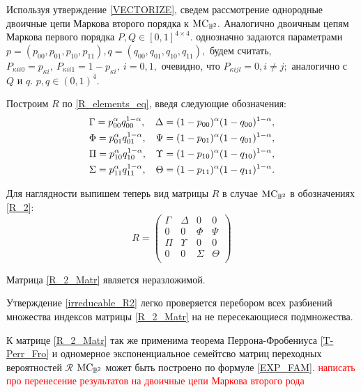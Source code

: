 Используя утверждение \ref{VECTORIZE}, сведем рассмотрение однородные двоичные цепи Маркова второго порядка к $\mathrm{MC}_{\mathbb{B}^2}.$ Аналогично двоичным цепям Маркова первого порядка $P, Q \in [0, 1]^{4 \times 4}.$ однозначно задаются параметрами $p = (p_{00}, p_{01}, p_{10}, p_{11}), q = (q_{00}, q_{01}, q_{10}, q_{11}),$ будем считать, $P_{{\kappa}i i0} = p_{{\kappa}i}, \ P_{{\kappa}i i1} = 1 - p_{{\kappa}i}, \ i = 0, 1,$ очевидно, что $P_{{\kappa}i jl} = 0, i \neq j;$ аналогично с $Q$ и $q.$ $p, q \in (0, 1)^{4}.$

Построим $R$ по \eqref{R_elements_eq}, введя следующие обозначения:
\begin{align}
\label{R_2}
& \Gamma = p_{00}^\alpha q_{00}^{1 - \alpha}, & \Delta = (1 - p_{00})^\alpha(1 - q_{00})^{1 - \alpha}, \nonumber \\
& \Phi = p_{01}^\alpha q_{01}^{1 - \alpha}, & \Psi = (1 - p_{01})^\alpha(1 - q_{01})^{1 - \alpha}, \nonumber \\
& \Pi = p_{10}^\alpha q_{10}^{1 - \alpha}, & \Upsilon = (1 - p_{10})^\alpha(1 - q_{10})^{1 - \alpha}, \nonumber \\
& \Sigma = p_{11}^\alpha q_{11}^{1 - \alpha}, & \Theta = (1 - p_{11})^\alpha(1 - q_{11})^{1 - \alpha}. 
\end{align}

Для наглядности выпишем теперь вид матрицы $R$ в случае $\mathrm{MC}_{\mathbb{B}^2}$ в обозначениях \eqref{R_2}:
\begin{equation} \label{R_2_Matr}
R = 
\begin{pmatrix}
\Gamma & \Delta & 0 & 0 \\
0 & 0 & \Phi & \Psi \\
\Pi & \Upsilon & 0 & 0 \\
0 & 0 & \Sigma & \Theta \\
\end{pmatrix}
\end{equation}

\begin{ass}
\label{irreducable_R2}
Матрица \eqref{R_2_Matr} является неразложимой. 
\end{ass}

Утверждение \ref{irreducable_R2} легко проверяется перебором всех разбиений множества индексов матрицы \eqref{R_2_Matr} на не пересекающиеся подмножества. 

К матрице \eqref{R_2_Matr} так же применима теорема Перрона-Фробениуса \ref{T-Perr_Fro} и одномерное экспоненциальное семейтсво матриц переходных вероятностей $\mathcal{R}$ $\mathrm{MC}_{\mathbb{B}^{2}}$ может быть построено по формуле \eqref{EXP_FAM}. {\textcolor{red}{ написать про перенесение результатов на двоичные цепи Маркова второго рода}}